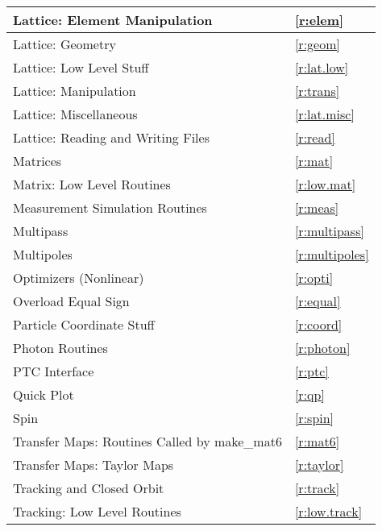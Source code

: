 \begin{center}
\begin{tabular}{|l|l|}
  Lattice: Element Manipulation               & \ref{r:elem}           \\ \hline
  Lattice: Geometry                           & \ref{r:geom}           \\ \hline
  Lattice: Low Level Stuff                    & \ref{r:lat.low}        \\ \hline
  Lattice: Manipulation                       & \ref{r:trans}          \\ \hline
  Lattice: Miscellaneous                      & \ref{r:lat.misc}      \\ \hline
  Lattice: Reading and Writing Files          & \ref{r:read}           \\ \hline
  Matrices                                    & \ref{r:mat}            \\ \hline
  Matrix: Low Level Routines                  & \ref{r:low.mat}        \\ \hline
  Measurement Simulation Routines             & \ref{r:meas}           \\ \hline
  Multipass                                   & \ref{r:multipass}      \\ \hline
  Multipoles                                  & \ref{r:multipoles}     \\ \hline
  Optimizers (Nonlinear)                      & \ref{r:opti}           \\ \hline
  Overload Equal Sign                         & \ref{r:equal}          \\ \hline
  Particle Coordinate Stuff                   & \ref{r:coord}          \\ \hline
  Photon Routines                             & \ref{r:photon}         \\ \hline
  PTC Interface                               & \ref{r:ptc}            \\ \hline
  Quick Plot                                  & \ref{r:qp}             \\ \hline
  Spin                                        & \ref{r:spin}           \\ \hline
  Transfer Maps: Routines Called by make_mat6 & \ref{r:mat6}           \\ \hline
  Transfer Maps: Taylor Maps                  & \ref{r:taylor}         \\ \hline
  Tracking and Closed Orbit                   & \ref{r:track}          \\ \hline
  Tracking: Low Level Routines                & \ref{r:low.track}      \\ \hline

\end{tabular}
\end{center}
